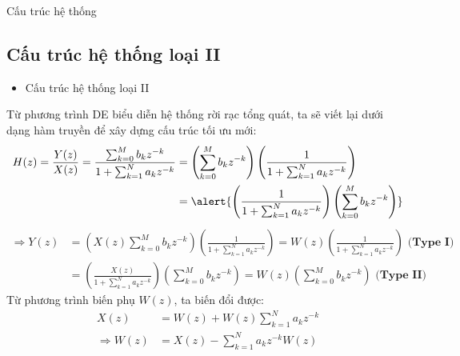 \documentclass[8pt]{beamer}
\begin{document}
\begin{frame}{Cấu trúc hệ thống}
\subsection{Cấu trúc hệ thống loại II}
\begin{itemize}
	\item Cấu trúc hệ thống loại II
\end{itemize}
Từ phương trình DE biểu diễn hệ thống rời rạc tổng quát, ta sẽ viết lại dưới dạng hàm truyền để xây dựng cấu trúc tối ưu mới:
\begin{equation*}
\begin{split}
	H(z)=\frac{Y(z)}{X(z)}=\frac{\sum_{k=0}^{M}b_{k}z^{-k}}{1+\sum_{k=1}^{N}a_{k}z^{-k}}&=\left(\sum_{k=0}^{M}b_{k}z^{-k}\right)\left(\frac{1}{1+\sum_{k=1}^{N}a_{k}z^{-k}}\right)\\
											    &=\alert{\left(\frac{1}{1+\sum_{k=1}^{N}a_{k}z^{-k}}\right)\left(\sum_{k=0}^{M}b_{k}z^{-k}\right)}\\
											    \end{split}
\end{equation*}
\begin{equation*}
\begin{split}
	\Rightarrow Y(z)&=\left(X(z)\sum_{k=0}^{M}b_{k}z^{-k}\right)\left(\frac{1}{1+\sum_{k=1}^{N}a_{k}z^{-k}}\right)=W(z)\left(\frac{1}{1+\sum_{k=1}^{N}a_{k}z^{-k}}\right)\textbf{ (Type I) }\\
			&=\left(\frac{X(z)}{1+\sum_{k=1}^{N}a_{k}z^{-k}}\right)\left(\sum_{k=0}^{M}b_{k}z^{-k}\right)=W(z)\left(\sum_{k=0}^{M}b_{k}z^{-k}\right)\textbf{ (Type II) }
\end{split}
\end{equation*}
Từ phương trình biến phụ $W(z)$, ta biến đổi được:
\begin{equation*}
\begin{split}
	X(z)&=W(z)+W(z)\sum_{k=1}^{N}a_{k}z^{-k}\\
	\Rightarrow W(z)&=X(z)-\sum_{k=1}^{N}a_{k}z^{-k}W(z)\\
\end{split}
\end{equation*}
\end{frame}
\end{document}
